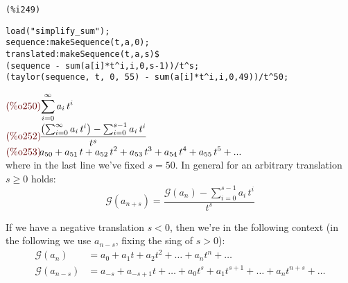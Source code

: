 \noindent
\begin{minipage}[t]{8ex}{\color{red}\bf
\begin{verbatim}
(%i249) 
\end{verbatim}}
\end{minipage}
\begin{minipage}[t]{\textwidth}{\color{blue}
\begin{verbatim}
load("simplify_sum");
sequence:makeSequence(t,a,0);
translated:makeSequence(t,a,s)$
(sequence - sum(a[i]*t^i,i,0,s-1))/t^s;
(taylor(sequence, t, 0, 55) - sum(a[i]*t^i,i,0,49))/t^50;
\end{verbatim}}
\end{minipage}
\begin{math}\displaystyle
\parbox{8ex}{\color{labelcolor}(\%o250) }
\sum_{i=0}^{\infty }{a}_{i}\,{t}^{i}
\end{math}\\
\begin{math}\displaystyle
\parbox{8ex}{\color{labelcolor}(\%o252) }
\frac{\left( \sum_{i=0}^{\infty }{a}_{i}\,{t}^{i}\right) -\sum_{i=0}^{s-1}{a}_{i}\,{t}^{i}}{{t}^{s}}
\end{math}\\
\begin{math}\displaystyle
\parbox{8ex}{\color{labelcolor}(\%o253) }
{a}_{50}+{a}_{51}\,t+{a}_{52}\,{t}^{2}+{a}_{53}\,{t}^{3}+{a}_{54}\,{t}^{4}+{a}_{55}\,{t}^{5}+...
\end{math}\\
where in the last line we've fixed $s = 50$. In general for an
arbitrary translation $s \geq 0$ holds:
\begin{equation*}
\mathcal{G}(a_{n+s}) =
\frac{\mathcal{G} (a_n) -\sum_{i=0}^{s-1}{a}_{i}\,{t}^{i}}{{t}^{s}}
\end{equation*}

If we have a negative translation $s < 0$, then we're in the following
context (in the following we use $a_{n-s}$, fixing the sing of $s >
0$):
\begin{displaymath}
  \begin{split}
    \mathcal{G} (a_n) &= a_0 + a_1 t + a_2 t^2 + \ldots + a_n t^n +
    \ldots \\
    \mathcal{G} (a_{n-s}) &= a_{-s} + a_{-s+1} t + \ldots + a_0 t^s +
    a_1 t^{s+1} + \ldots + a_n t^{n+s} + \ldots
  \end{split}
\end{displaymath}

